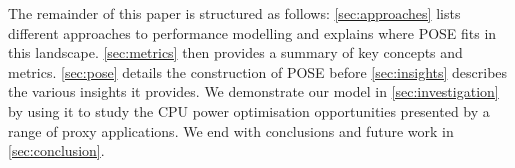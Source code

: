 The remainder of this paper is structured as follows: \autoref{sec:approaches} lists different approaches to performance modelling and explains where POSE fits in this landscape.
\autoref{sec:metrics} then provides a summary of key concepts and metrics.
\autoref{sec:pose} details the construction of POSE before \autoref{sec:insights} describes the various insights it provides.
We demonstrate our model in \autoref{sec:investigation} by using it to study the CPU power optimisation opportunities presented by a range of proxy applications. 
We end with conclusions and future work in \autoref{sec:conclusion}.
